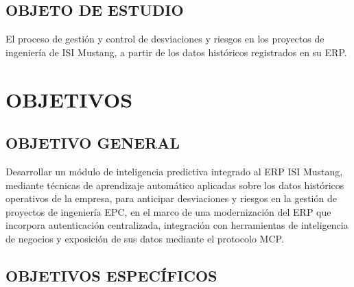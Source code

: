 \documentclass{univalle-perfil}
\begin{document}
\subsection{OBJETO DE ESTUDIO}

El proceso de gestión y control de desviaciones y riesgos en los proyectos de ingeniería de ISI Mustang, a partir de los datos históricos registrados en su ERP.

\section{OBJETIVOS}

\subsection{OBJETIVO GENERAL}

Desarrollar un módulo de inteligencia predictiva integrado al ERP ISI Mustang, mediante técnicas de aprendizaje automático aplicadas sobre los datos históricos operativos de la empresa, para anticipar desviaciones y riesgos en la gestión de proyectos de ingeniería EPC, en el marco de una modernización del ERP que incorpora autenticación centralizada, integración con herramientas de inteligencia de negocios y exposición de sus datos mediante el protocolo MCP.

\subsection{OBJETIVOS ESPECÍFICOS}
\end{document}
